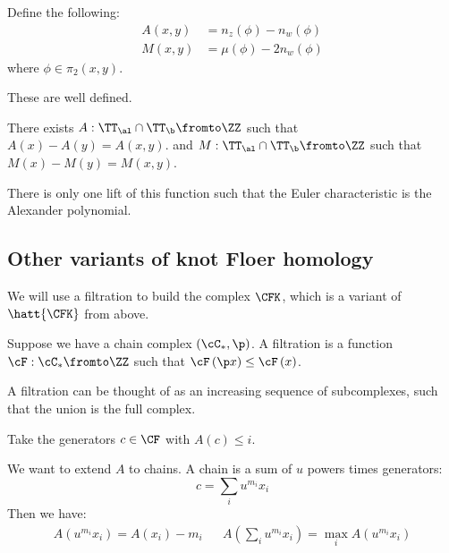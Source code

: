 \documentclass{amsproc}
\begin{document}
Define the following:
\begin{align}
A\left( x , y \right) &= n_z\left( \phi \right) - n_w\left( \phi \right)
\\
M\left( x , y \right) &= \mu\left( \phi \right) - 2 n_w\left( \phi \right)
\end{align}
where $\phi \in \pi_2\left( x , y \right)$.

\begin{fact}
These are well defined.
\end{fact}

\begin{fact}
There exists $A:\TT_\al \cap \TT_\b \fromto \ZZ$ such that
$A\left( x \right) - A\left( y \right) = A\left( x , y \right)$.
and $M : \TT_\al \cap \TT_\b \fromto \ZZ$ such that
$M\left( x \right) - M\left( y \right) = M\left( x , y \right)$.
\end{fact}

\begin{fact}
There is only one lift of this function such that the 
Euler characteristic is the Alexander polynomial.
\end{fact}

\subsection{Other variants of knot Floer homology}

We will use a filtration to build the complex $\CFK$, which
is a variant of $\hatt{\CFK}$ from above.

\begin{defn}
Suppose we have a chain complex $\left( \cC_* , \p \right)$.
A filtration is a function $\cF:\cC_*\fromto \ZZ$ such that 
$\cF\left( \p x \right)\leq \cF\left( x \right)$. 
\end{defn}

A filtration can be thought of as an increasing
sequence of subcomplexes, such that the union is the full complex.

Take the generators $c\in \CF$ with $A\left( c \right) \leq i$. 

We want to extend $A$ to chains. 
A chain is a sum of $u$ powers times generators:
\begin{equation}
c = \sum_i u^{m_i} x_i
\end{equation}
Then we have:
\begin{align}
A\left( u^{m_i} x_i \right) = A\left( x_i \right) - m_i
&&
A\left( \sum_i u^{m_i} x_i \right) = 
\max_i A\left( u^{m_i} x_i\right)
\end{align}
\end{document}

